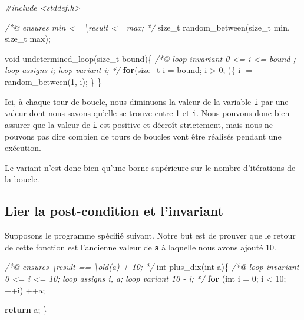 \documentclass[12pt,francais,]{scrbook}
\newenvironment{Shaded}{}{}
\newcommand{\KeywordTok}[1]{\textcolor[rgb]{0.00,0.44,0.13}{\textbf{{#1}}}}
\newcommand{\DataTypeTok}[1]{\textcolor[rgb]{0.56,0.13,0.00}{{#1}}}
\newcommand{\DecValTok}[1]{\textcolor[rgb]{0.25,0.63,0.44}{{#1}}}
\newcommand{\CommentTok}[1]{\textcolor[rgb]{0.38,0.63,0.69}{\textit{{#1}}}}
\newcommand{\NormalTok}[1]{{#1}}
\begin{document}
\begin{footnotesize}\begin{Shaded}
\begin{Highlighting}[]
\CommentTok{#include <stddef.h>}

\CommentTok{/*@}
\CommentTok{  ensures min <= \textbackslash{}result <= max;}
\CommentTok{*/}
\NormalTok{size_t random_between(size_t min, size_t max);}

\DataTypeTok{void} \NormalTok{undetermined_loop(size_t bound)\{}
  \CommentTok{/*@}
\CommentTok{    loop invariant 0 <= i <= bound ;}
\CommentTok{    loop assigns i;}
\CommentTok{    loop variant i;}
\CommentTok{   */}
  \KeywordTok{for}\NormalTok{(size_t i = bound; i > }\DecValTok{0}\NormalTok{; )\{}
    \NormalTok{i -= random_between(}\DecValTok{1}\NormalTok{, i);}
  \NormalTok{\}}
\NormalTok{\}}
\end{Highlighting}
\end{Shaded}\end{footnotesize}

Ici, à chaque tour de boucle, nous diminuons la valeur de la variable
\texttt{i} par une valeur dont nous savons qu'elle se trouve entre 1 et
\texttt{i}. Nous pouvons donc bien assurer que la valeur de \texttt{i}
est positive et décroît strictement, mais nous ne pouvons pas dire
combien de tours de boucles vont être réalisés pendant une exécution.

Le variant n'est donc bien qu'une borne supérieure sur le nombre
d'itérations de la boucle.

\subsection{Lier la post-condition et
l'invariant}\label{lier-la-post-condition-et-linvariant}

Supposons le programme spécifié suivant. Notre but est de prouver que le
retour de cette fonction est l'ancienne valeur de \texttt{a} à laquelle
nous avons ajouté 10.

\begin{footnotesize}\begin{Shaded}
\begin{Highlighting}[]
\CommentTok{/*@}
\CommentTok{    ensures \textbackslash{}result == \textbackslash{}old(a) + 10;}
\CommentTok{*/}
\DataTypeTok{int} \NormalTok{plus_dix(}\DataTypeTok{int} \NormalTok{a)\{}
    \CommentTok{/*@}
\CommentTok{        loop invariant 0 <= i <= 10;}
\CommentTok{        loop assigns i, a;}
\CommentTok{        loop variant 10 - i;}
\CommentTok{    */}
    \KeywordTok{for} \NormalTok{(}\DataTypeTok{int} \NormalTok{i = }\DecValTok{0}\NormalTok{; i < }\DecValTok{10}\NormalTok{; ++i)}
        \NormalTok{++a;}

    \KeywordTok{return} \NormalTok{a;}
\NormalTok{\}}
\end{Highlighting}
\end{Shaded}\end{footnotesize}
\end{document}
